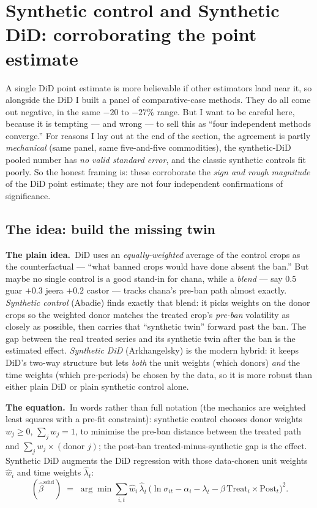 \documentclass[11pt]{article}
\newcommand{\intuit}{\smallskip\noindent\textbf{The plain idea.}\ }
\newcommand{\formula}{\smallskip\noindent\textbf{The equation.}\ }
\begin{document}
\section{Synthetic control and Synthetic DiD: corroborating the point estimate}

A single DiD point estimate is more believable if other estimators land near it, so alongside the
DiD I built a panel of comparative-case methods. They do all come out negative, in the same
$-20$ to $-27\%$ range. But I want to be careful here, because it is tempting --- and wrong --- to
sell this as ``four independent methods converge.'' For reasons I lay out at the end of the section,
the agreement is partly \emph{mechanical} (same panel, same five-and-five commodities), the
synthetic-DiD pooled number has \emph{no valid standard error}, and the classic synthetic controls
fit poorly. So the honest framing is: these corroborate the \emph{sign and rough magnitude} of the
DiD point estimate; they are not four independent confirmations of significance.

\subsection{The idea: build the missing twin}

\intuit DiD uses an \emph{equally-weighted} average of the control crops as the counterfactual ---
``what banned crops would have done absent the ban.'' But maybe no single control is a good stand-in
for chana, while a \emph{blend} --- say $0.5$ guar $+ 0.3$ jeera $+ 0.2$ castor --- tracks chana's
pre-ban path almost exactly. \emph{Synthetic control} (Abadie) finds exactly that blend: it picks
weights on the donor crops so the weighted donor matches the treated crop's \emph{pre-ban}
volatility as closely as possible, then carries that ``synthetic twin'' forward past the ban. The
gap between the real treated series and its synthetic twin after the ban is the estimated effect.
\emph{Synthetic DiD} (Arkhangelsky) is the modern hybrid: it keeps DiD's two-way structure but lets
\emph{both} the unit weights (which donors) \emph{and} the time weights (which pre-periods) be chosen
by the data, so it is more robust than either plain DiD or plain synthetic control alone.

\formula In words rather than full notation (the mechanics are weighted least squares with a
pre-fit constraint): synthetic control chooses donor weights $w_j \ge 0$, $\sum_j w_j = 1$, to
minimise the pre-ban distance between the treated path and $\sum_j w_j \times (\text{donor }j)$;
the post-ban treated-minus-synthetic gap is the effect. Synthetic DiD augments the DiD regression
with those data-chosen unit weights $\hat w_i$ and time weights $\hat\lambda_t$:
\[
(\hat\beta^{\text{sdid}}) \;=\; \arg\min \sum_{i,t} \hat w_i\,\hat\lambda_t\,\big(\ln\sigma_{it} - \alpha_i - \lambda_t - \beta\,\mathrm{Treat}_i\!\times\!\mathrm{Post}_t\big)^2.
\]
\end{document}
